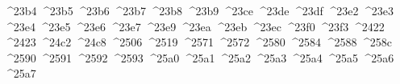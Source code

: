 {  ^^^^23b4%
  ^^^^23b5%
  ^^^^23b6%
  ^^^^23b7%
  ^^^^23b8%
  ^^^^23b9%
  ^^^^23ce%
  ^^^^23de%
  ^^^^23df%
  ^^^^23e2%
  ^^^^23e3%
  ^^^^23e4%
  ^^^^23e5%
  ^^^^23e6%
  ^^^^23e7%
  ^^^^23e9%
  ^^^^23ea%
  ^^^^23eb%
  ^^^^23ec%
  ^^^^23f0%
  ^^^^23f3%
  ^^^^2422%
  ^^^^2423%
  ^^^^24c2%
  ^^^^24c8%
  ^^^^2506%
  ^^^^2519%
  ^^^^2571%
  ^^^^2572%
  ^^^^2580%
  ^^^^2584%
  ^^^^2588%
  ^^^^258c%
  ^^^^2590%
  ^^^^2591%
  ^^^^2592%
  ^^^^2593%
  ^^^^25a0%
  ^^^^25a1%
  ^^^^25a2%
  ^^^^25a3%
  ^^^^25a4%
  ^^^^25a5%
  ^^^^25a6%
  ^^^^25a7%
}
